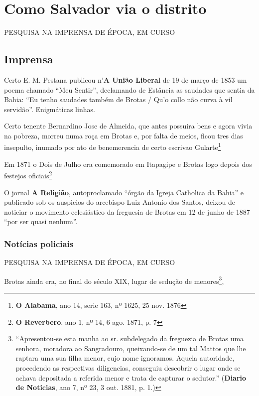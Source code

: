 \section{Como Salvador via o distrito}\label{sec:2.5}

PESQUISA NA IMPRENSA DE ÉPOCA, EM CURSO

\subsection{Imprensa}\label{subsec:2.5.1}




Certo E. M. Pestana publicou n'\textbf{A União Liberal} de 19 de março de 1853 um poema chamado ``Meu Sentir'', declamando de Estância as saudades que sentia da Bahia: ``Eu tenho saudades também de Brotas / Qu'o collo não curva à vil servidão''. Enigmáticas linhas.

Certo tenente Bernardino Jose de Almeida, que antes possuira bens e agora vivia na pobreza, morreu numa roça em Brotas e, por falta de meios, ficou tres dias insepulto, inumado por ato de benemerencia de certo escrivao Gularte\footnote{\textbf{O Alabama}, ano 14, serie 163, nº 1625, 25 nov. 1876}

Em 1871 o Dois de Julho era comemorado em Itapagipe e Brotas logo depois dos festejos oficiais\footnote{\textbf{O Reverbero}, ano 1, nº 14, 6 ago. 1871, p. 7}

O jornal \textbf{A Religião}, autoproclamado ``órgão da Igreja Catholica da Bahia'' e publicado sob os auspicios do arcebispo Luiz Antonio dos Santos, deixou de noticiar o movimento eclesiástico da freguesia de Brotas em 12 de junho de 1887   ``por ser quasi nenhum''.

\subsubsection{Notícias policiais}\label{subsubsec:2.5.1.1}

PESQUISA NA IMPRENSA DE ÉPOCA, EM CURSO

Brotas ainda era, no final do século XIX, lugar de sedução de menores\footnote{  ``Apresentou-se esta manha ao sr. subdelegado da freguezia de Brotas uma senhora, moradora ao Sangradouro, queixando-se de um tal Mattos que lhe raptara uma sua filha menor, cujo nome ignoramos. Aquela autoridade, procedendo as respectivas diligencias, conseguiu descobrir o lugar onde se achava depositada a referida menor e trata de capturar o sedutor.'' (\textbf{Diario de Noticias}, ano 7, nº 23, 3 out. 1881, p. 1.)}, 

